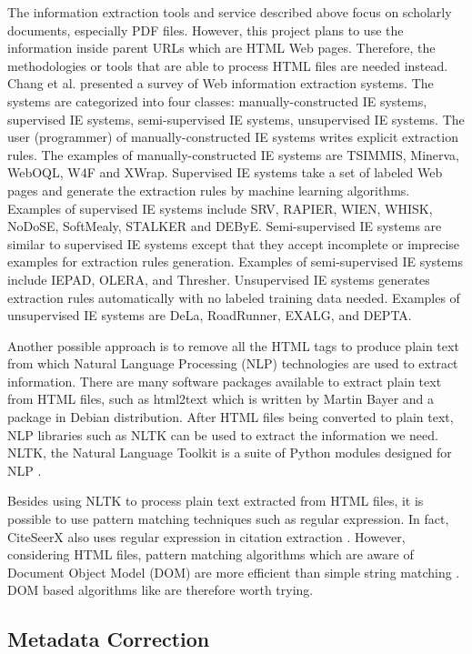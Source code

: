 \documentclass[prodmode]{acmsmall} %
\begin{document}
The information extraction tools and service described above focus on scholarly documents, especially PDF files. However, this project plans to use the information inside parent URLs which are HTML Web pages. Therefore, the methodologies or tools that are able to process HTML files are needed instead. Chang et al. presented a survey of Web information extraction systems. The systems are categorized into four classes: manually-constructed IE systems, supervised IE systems, semi-supervised IE systems, unsupervised IE systems. The user (programmer) of manually-constructed IE systems writes explicit extraction rules. The examples of manually-constructed IE systems are TSIMMIS, Minerva, WebOQL, W4F and XWrap. Supervised IE systems take a set of labeled Web pages and generate the extraction rules by machine learning algorithms. Examples of supervised IE systems include SRV, RAPIER, WIEN, WHISK, NoDoSE, SoftMealy, STALKER and DEByE. Semi-supervised IE systems are similar to supervised IE systems except that they accept incomplete or imprecise examples for extraction rules generation. Examples of semi-supervised IE systems include IEPAD, OLERA, and Thresher. Unsupervised IE systems generates extraction rules automatically with no labeled training data needed. Examples of unsupervised IE systems are DeLa, RoadRunner, EXALG, and DEPTA. \cite{Chang2006}

Another possible approach is to remove all the HTML tags to produce plain text from which Natural Language Processing (NLP) technologies are used to extract information. There are many software packages available to extract plain text from HTML files, such as html2text which is written by Martin Bayer and a package in Debian distribution. After HTML files being converted to plain text, NLP libraries such as NLTK can be used to extract the information we need. NLTK, the Natural Language Toolkit is a suite of Python modules designed for NLP \cite{Loper2002}.

Besides using NLTK to process plain text extracted from HTML files, it is possible to use pattern matching techniques such as regular expression. In fact, CiteSeerX also uses regular expression in citation extraction \cite{Wu2014b}. However, considering HTML files, pattern matching algorithms which are aware of Document Object Model (DOM) are more efficient than simple string matching \cite{Kim2007}. DOM based algorithms like \cite{Gupta2003} are therefore worth trying.

\subsection{Metadata Correction}
\end{document}
